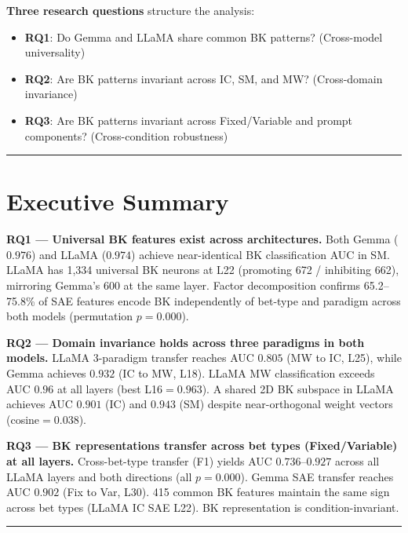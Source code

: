 \documentclass[11pt,a4paper]{article}
\begin{document}
\medskip\noindent\textbf{Three research questions} structure the analysis:
\begin{itemize}[nosep]
    \item \textbf{RQ1}: Do Gemma and LLaMA share common BK patterns? (Cross-model universality)
    \item \textbf{RQ2}: Are BK patterns invariant across IC, SM, and MW? (Cross-domain invariance)
    \item \textbf{RQ3}: Are BK patterns invariant across Fixed/Variable and prompt components? (Cross-condition robustness)
\end{itemize}

\bigskip\hrule\bigskip

\section*{Executive Summary}

\textbf{RQ1 --- Universal BK features exist across architectures.} Both Gemma ($0.976$) and LLaMA ($0.974$) achieve near-identical BK classification AUC in SM. LLaMA has 1,334 universal BK neurons at L22 (promoting 672 / inhibiting 662), mirroring Gemma's 600 at the same layer. Factor decomposition confirms 65.2--75.8\% of SAE features encode BK independently of bet-type and paradigm across both models (permutation $p=0.000$).

\medskip\textbf{RQ2 --- Domain invariance holds across three paradigms in both models.} LLaMA 3-paradigm transfer reaches AUC $0.805$ (MW to IC, L25), while Gemma achieves $0.932$ (IC to MW, L18). LLaMA MW classification exceeds AUC $0.96$ at all layers (best L16$=0.963$). A shared 2D BK subspace in LLaMA achieves AUC $0.901$ (IC) and $0.943$ (SM) despite near-orthogonal weight vectors (cosine$=0.038$).

\medskip\textbf{RQ3 --- BK representations transfer across bet types (Fixed/Variable) at all layers.} Cross-bet-type transfer (F1) yields AUC $0.736$--$0.927$ across all LLaMA layers and both directions (all $p=0.000$). Gemma SAE transfer reaches AUC $0.902$ (Fix to Var, L30). 415 common BK features maintain the same sign across bet types (LLaMA IC SAE L22). BK representation is condition-invariant.

\bigskip\hrule\bigskip

\end{document}
